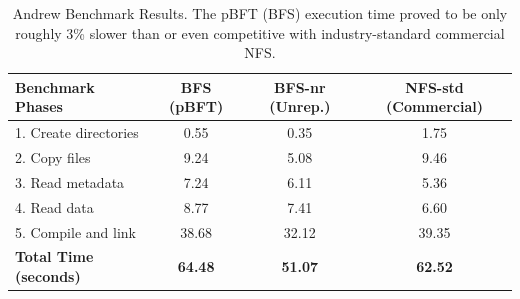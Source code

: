 \begin{table}[h!]
\centering
\begin{tabular}{|l|c|c|c|}
\hline
\textbf{Benchmark Phases} & \textbf{BFS (pBFT)} & \textbf{BFS-nr (Unrep.)} & \textbf{NFS-std (Commercial)} \\ \hline
1. Create directories & 0.55 & 0.35 & 1.75 \\ \hline
2. Copy files & 9.24 & 5.08 & 9.46 \\ \hline
3. Read metadata & 7.24 & 6.11 & 5.36 \\ \hline
4. Read data & 8.77 & 7.41 & 6.60 \\ \hline
5. Compile and link & 38.68 & 32.12 & 39.35 \\ \hline
\textbf{Total Time (seconds)} & \textbf{64.48} & \textbf{51.07} & \textbf{62.52} \\ \hline
\end{tabular}
\caption{Andrew Benchmark Results. The pBFT (BFS) execution time proved to be only roughly 3\% slower than or even competitive with industry-standard commercial NFS.}
\end{table}